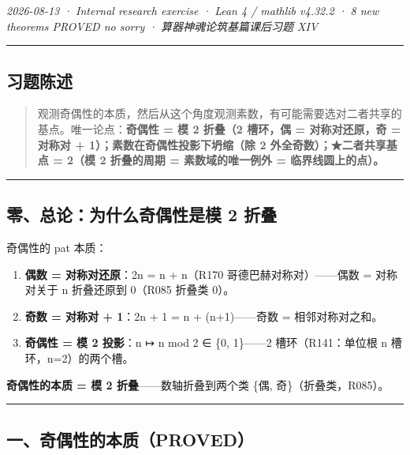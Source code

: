 \documentclass[
]{article}
\providecommand{\tightlist}{%
  \setlength{\itemsep}{0pt}\setlength{\parskip}{0pt}}
\begin{document}
\emph{2026-08-13 · Internal research exercise · Lean 4 / mathlib v4.32.2
· 8 new theorems PROVED no sorry · 算器神魂论筑基篇课后习题 XIV }

\begin{center}\rule{0.5\linewidth}{0.5pt}\end{center}

\subsection{习题陈述}\label{ux4e60ux9898ux9648ux8ff0}

\begin{quote}
观测奇偶性的本质，然后从这个角度观测素数，有可能需要选对二者共享的基点。唯一论点：\textbf{奇偶性
= 模 2 折叠（2 槽环，偶 = 对称对还原，奇 = 对称对 +
1）；素数在奇偶性投影下坍缩（除 2 外全奇数）；★二者共享基点 = 2（模 2
折叠的周期 = 素数域的唯一例外 = 临界线圆上的点）。}
\end{quote}

\begin{center}\rule{0.5\linewidth}{0.5pt}\end{center}

\subsection{零、总论：为什么奇偶性是模 2
折叠}\label{ux96f6ux603bux8bbaux4e3aux4ec0ux4e48ux5947ux5076ux6027ux662fux6a21-2-ux6298ux53e0}

奇偶性的 pat 本质：

\begin{enumerate}
\def\labelenumi{\arabic{enumi}.}
\tightlist
\item
  \textbf{偶数 = 对称对还原}：2n = n + n（R170
  哥德巴赫对称对）------偶数 = 对称对关于 n 折叠还原到 0（R085 折叠类
  0）。
\item
  \textbf{奇数 = 对称对 + 1}：2n + 1 = n + (n+1)------奇数 =
  相邻对称对之和。
\item
  \textbf{奇偶性 = 模 2 投影}：n ↦ n mod 2 ∈ \{0, 1\}------2
  槽环（R141：单位根 n 槽环，n=2）的两个槽。
\end{enumerate}

\textbf{奇偶性的本质 = 模 2 折叠}------数轴折叠到两个类 \{偶,
奇\}（折叠类，R085）。

\begin{center}\rule{0.5\linewidth}{0.5pt}\end{center}

\subsection{一、奇偶性的本质（PROVED）}\label{ux4e00ux5947ux5076ux6027ux7684ux672cux8d28proved}
\end{document}

